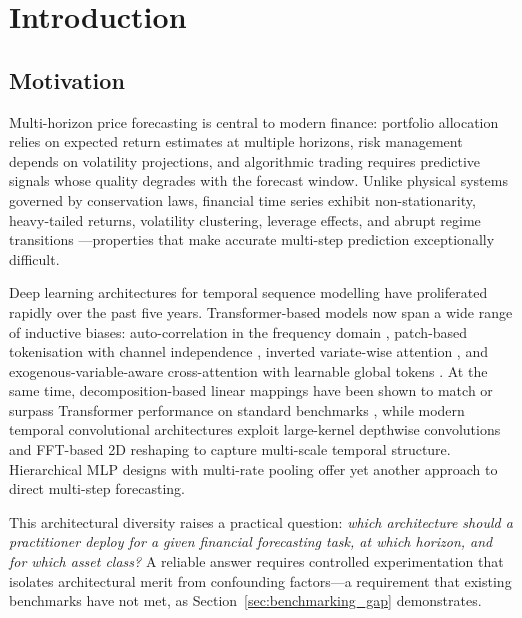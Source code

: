 \section{Introduction}
\label{sec:introduction}

\subsection{Motivation}
\label{sec:motivation}

Multi-horizon price forecasting is central to modern finance: portfolio allocation relies on expected return estimates at multiple horizons, risk management depends on volatility projections, and algorithmic trading requires predictive signals whose quality degrades with the forecast window.  Unlike physical systems governed by conservation laws, financial time series exhibit non-stationarity, heavy-tailed returns, volatility clustering, leverage effects, and abrupt regime transitions \citep{Cont2001, Fama1970}---properties that make accurate multi-step prediction exceptionally difficult.

Deep learning architectures for temporal sequence modelling have proliferated rapidly over the past five years.  Transformer-based models now span a wide range of inductive biases: auto-correlation in the frequency domain \citep{Wu2021}, patch-based tokenisation with channel independence \citep{Nie2023}, inverted variate-wise attention \citep{Liu2024itransformer}, and exogenous-variable-aware cross-attention with learnable global tokens \citep{Wang2024timexer}.  At the same time, decomposition-based linear mappings have been shown to match or surpass Transformer performance on standard benchmarks \citep{Zeng2023}, while modern temporal convolutional architectures exploit large-kernel depthwise convolutions \citep{Luo2024moderntcn} and FFT-based 2D reshaping \citep{Wu2023timesnet} to capture multi-scale temporal structure.  Hierarchical MLP designs with multi-rate pooling \citep{Challu2023} offer yet another approach to direct multi-step forecasting.

This architectural diversity raises a practical question: \emph{which architecture should a practitioner deploy for a given financial forecasting task, at which horizon, and for which asset class?}  A reliable answer requires controlled experimentation that isolates architectural merit from confounding factors---a requirement that existing benchmarks have not met, as Section~\ref{sec:benchmarking_gap} demonstrates.


